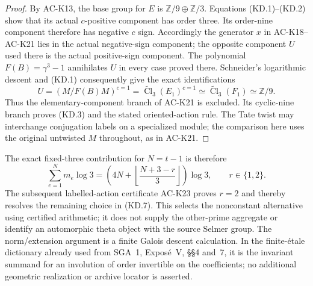\begin{proof}
By AC-K13, the base group for $E$ is
$\mathbb Z/9\oplus\mathbb Z/3$.
Equations (KD.1)--(KD.2) show that its actual $c$-positive
component has order three.  Its order-nine component
therefore has negative $c$ sign.
Accordingly the generator $x$ in AC-K18--AC-K21 lies
in the actual negative-sign component; the opposite
component $U$ used there is the actual positive-sign component.
The polynomial $F(B)=\gamma^3-1$ annihilates $U$ in every
case proved there.  Schneider's logarithmic descent and
(KD.1) consequently give the exact identifications
\[
 U=(M/F(B)M)^{c=1}
   =\widetilde{\operatorname{Cl}}_3(E_1)^{c=1}
   \simeq\widetilde{\operatorname{Cl}}_3(F_1)
   \simeq\mathbb Z/9.                                \tag{KD.6}
\]
Thus the elementary-component branch of AC-K21 is excluded.
Its cyclic-nine branch proves (KD.3) and the stated
oriented-action rule.  The Tate twist may interchange
conjugation labels on a specialized module; the comparison
here uses the original untwisted $M$ throughout, as in AC-K21.
\end{proof}

The exact fixed-three contribution for $N=t-1$ is therefore
\[
 \sum_{e=1}^{N}m_e\log3
   =\left(4N+\left\lfloor\frac{N+3-r}{3}\right\rfloor\right)\log3,
                      \qquad r\in\{1,2\}.            \tag{KD.7}
\]
The subsequent labelled-action certificate AC-K23 proves
$r=2$ and thereby resolves the remaining choice in (KD.7).
This selects the nonconstant alternative using certified
arithmetic; it does not supply the other-prime aggregate
or identify an automorphic theta object with the source Selmer group.
The norm/extension argument is a finite Galois descent
calculation.  In the finite-\'etale dictionary already used
from SGA~1, Expos\'e~V, \S\S4 and~7, it is the invariant
summand for an involution of order invertible on the coefficients;
no additional geometric realization or archive locator is asserted.

